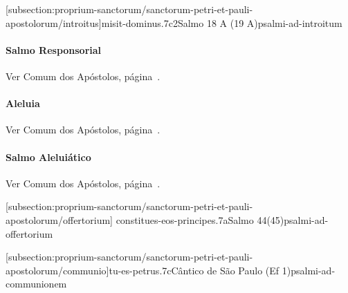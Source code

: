 \def\Prefix{subsection:proprium-sanctorum/sanctorum-petri-et-pauli-apostolorum}

[\Prefix/introitus]{misit-dominus.7c2}{Salmo 18 A (19 A)}{psalmi-ad-introitum}

\paragraph{Salmo Responsorial}
\begin{rubrica}
	Ver Comum dos Apóstolos, página~\pageref{subsection:communia/commune-apostolorum/psalmus-responsorius}.
\end{rubrica}
\vspace{-2mm}

\paragraph{Aleluia}
\begin{rubrica}
	Ver Comum dos Apóstolos, página~\pageref{subsection:communia/commune-apostolorum/alleluia}.
\end{rubrica}
\vspace{-2mm}

\paragraph{Salmo Aleluiático}
\begin{rubrica}
	Ver Comum dos Apóstolos, página~\pageref{subsection:communia/commune-apostolorum/psalmus-alleluiaticus}.
\end{rubrica}
\vspace{-2mm}

\AllowPageFlush

[\Prefix/offertorium]
{constitues-eos-principes.7a}{Salmo 44(45)}{psalmi-ad-offertorium}

\AllowPageBreak

[\Prefix/communio]{tu-es-petrus.7c}{Cântico de São Paulo (Ef 1)}{psalmi-ad-communionem}

\AllowPageFlush